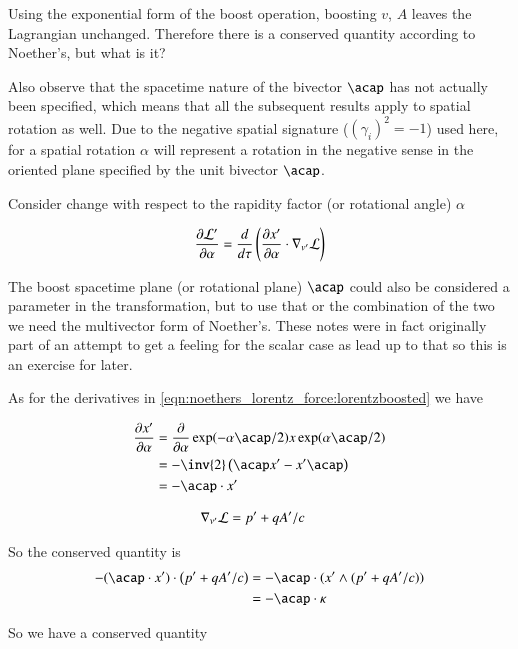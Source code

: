 Using the exponential form of the boost operation, boosting $v$, $A$ leaves the Lagrangian unchanged.
Therefore there is a conserved quantity according to Noether's, but what is it?

Also observe that the spacetime nature of the bivector $\acap$ has not actually been specified, which means that all the
subsequent results apply to spatial rotation as well.  Due to the negative spatial signature ($(\gamma_i)^2=-1$) used here, for a spatial rotation $\alpha$ will represent a rotation in the negative sense in the oriented plane specified by the unit bivector $\acap$.

Consider change with respect to the rapidity factor (or rotational angle) $\alpha$

\begin{align}\label{eqn:noethers_lorentz_force:lorentzboosted}
\frac{\partial {\mathcal{L}'}}{\partial {\alpha}} = \frac{d}{d\tau} \left( \frac{\partial {x'}}{\partial {\alpha}} \cdot \nabla_{v'} \mathcal{L} \right)
\end{align}

The boost spacetime plane (or rotational plane) $\acap$ could also be considered a parameter in the transformation, but to use that or the combination of the
two we need the multivector form of Noether's.  These notes were in fact originally part of an attempt 
to get a feeling for the scalar case as lead up to that so this is an exercise for later.

As for the derivatives in \ref{eqn:noethers_lorentz_force:lorentzboosted} we have

\begin{align*}
\PD{\alpha}{x'} 
&= \PD{\alpha}{} \exp(-\alpha \acap/2) x \exp(\alpha \acap/2) \\
&= -\inv{2} \left(\acap x' - x'\acap\right) \\
&= - \acap \cdot x' \\
\end{align*}

\begin{align*}
\nabla_{v'} \mathcal{L} &= p' + qA'/c
\end{align*}

So the conserved quantity is
\begin{align*}
- (\acap \cdot x') \cdot \left( p' + qA'/c \right)
&= - \acap \cdot (x' \wedge (p' + qA'/c ) ) \\
&= -\acap \cdot \kappa
\end{align*}

So we have a conserved quantity

